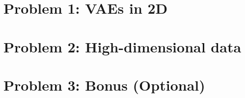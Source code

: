 \documentclass[11pt,letterpaper]{article}
\begin{document}
\section*{Problem 1: VAEs in 2D}

\newpage
\null\newpage

\section*{Problem 2: High-dimensional data}

\newpage
\null\newpage


\section*{Problem 3: Bonus (Optional)}

\newpage
\null\newpage
\end{document}
